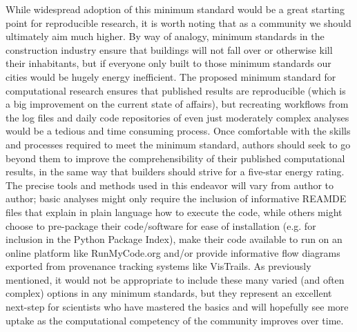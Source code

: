 While widespread adoption of this minimum standard would be a great starting point for reproducible research, it is worth noting that as a community we should ultimately aim much higher. By way of analogy, minimum standards in the construction industry ensure that buildings will not fall over or otherwise kill their inhabitants, but if everyone only built to those minimum standards our cities would be hugely energy inefficient. The proposed minimum standard for computational research ensures that published results are reproducible (which is a big improvement on the current state of affairs), but recreating workflows from the log files and daily code repositories of even just moderately complex analyses would be a tedious and time consuming process. Once comfortable with the skills and processes required to meet the minimum standard, authors should seek to go beyond them to improve the comprehensibility of their published computational results, in the same way that builders should strive for a five-star energy rating. The precise tools and methods used in this endeavor will vary from author to author; basic analyses might only require the inclusion of informative REAMDE files that explain in plain language how to execute the code, while others might choose to pre-package their code/software for ease of installation (e.g. for inclusion in the Python Package Index), make their code available to run on an online platform like RunMyCode.org and/or provide informative flow diagrams exported from provenance tracking systems like VisTrails. As previously mentioned, it would not be appropriate to include these many varied (and often complex) options in any minimum standards, but they represent an excellent next-step for scientists who have mastered the basics and will hopefully see more uptake as the computational competency of the community improves over time.

  
  
  
  
  
  
  
  
  
  
  